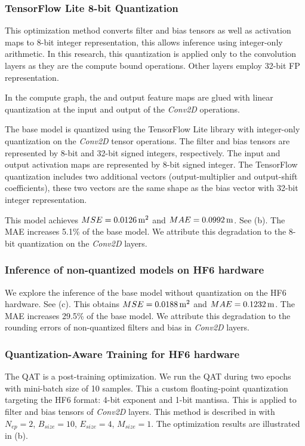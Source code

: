 \subsubsection{TensorFlow Lite 8-bit Quantization}
This optimization method converts filter and bias tensors as well as activation maps to 8-bit integer representation, this allows inference using integer-only arithmetic\cite{hannwindowsine}. In this research, this quantization is applied only to the convolution layers as they are the compute bound operations. Other layers employ 32-bit FP representation.

In the compute graph, the  and output feature maps are glued with linear quantization at the input and output of the \emph{Conv2D} operations.

The base model is quantized using the TensorFlow Lite library with integer-only quantization on the \emph{Conv2D} tensor operations. The filter and bias tensors are represented by 8-bit and 32-bit signed integers, respectively. The input and output activation maps are represented by 8-bit signed integer. The TensorFlow quantization includes two additional vectors (output-multiplier and output-shift coefficients), these two vectors are the same shape as the bias vector with 32-bit integer representation.

This model achieves $MSE=\unit[0.0126]{m^2}$ and $MAE=\unit[0.0992]{m}$. See (b). The MAE increases 5.1\% of the base model. We attribute this degradation to the 8-bit quantization on the \emph{Conv2D} layers.

\subsubsection{Inference of non-quantized models on HF6 hardware}
We explore the inference of the base model without quantization on the HF6 hardware. See (c). This obtains $MSE=\unit[0.0188]{m^2}$ and $MAE=\unit[0.1232]{m}$. The MAE increases 29.5\% of the base model. We attribute this degradation to the rounding errors of non-quantized filters and bias in \emph{Conv2D} layers.

\subsubsection{Quantization-Aware Training for HF6 hardware}
The QAT is a post-training optimization. We run the QAT during two epochs with mini-batch size of 10 samples. This a custom floating-point quantization  targeting the HF6 format: 4-bit exponent and 1-bit mantissa. This is applied to filter and bias tensors of \emph{Conv2D} layers. This method is described in  with $N_{ep}=2$, $B_{size}=10$, $E_{size}=4$, $M_{size}=1$. The optimization results are illustrated in (b).

